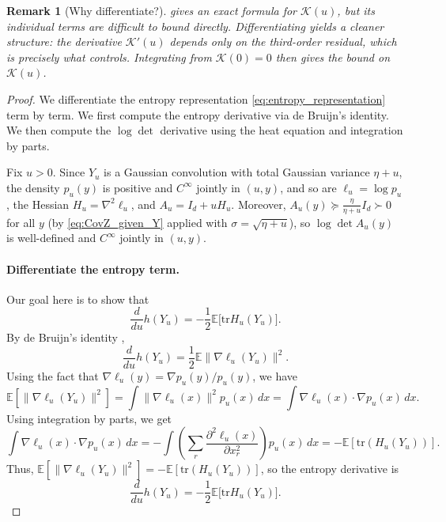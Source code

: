 \documentclass[11pt]{article}
\def\E{\mathbb{E}}
\newcommand{\norm}[1]{\|#1\|}
\newcommand{\tr}{\mathrm{tr}}
\newtheorem{remark}{Remark}
\begin{document}
\begin{remark}[Why differentiate?]
\label{rem:why_differentiate}
 gives an exact formula for \(\mathcal K(u)\), but its individual terms are difficult to bound directly. Differentiating yields a cleaner structure: the derivative \(\mathcal K'(u)\) depends only on the third-order residual, which is precisely what  controls. Integrating from \(\mathcal K(0)=0\) then gives the bound on \(\mathcal K(u)\).
\end{remark}

\begin{proof}
We differentiate the entropy representation \eqref{eq:entropy_representation} term by term. We first compute the entropy derivative via de Bruijn's identity. We then compute the \(\log\det\) derivative using the heat equation and integration by parts. 

Fix \(u>0\). Since \(Y_u\) is a Gaussian convolution with total Gaussian variance \(\eta+u\), the density \(p_u(y)\) is positive and \(C^\infty\) jointly in \((u,y)\), and so are \(\ell_u=\log p_u\), the Hessian \(H_u=\nabla^2\ell_u\), and \(A_u=I_d+uH_u\). Moreover, \(A_u(y)\succeq \frac{\eta}{\eta+u}I_d\succ 0\) for all \(y\) (by \eqref{eq:CovZ_given_Y} applied with \(\sigma=\sqrt{\eta+u}\)), so \(\log\det A_u(y)\) is well-defined and \(C^\infty\) jointly in \((u,y)\).

\paragraph{Differentiate the entropy term.} Our goal here is to show that
\[
\frac{d}{du}h(Y_u) = -\frac12\E\big[\tr H_u(Y_u)\big].
\]
By de Bruijn's identity \cite{stam1959some},
\[
\frac{d}{du}h(Y_u)=\frac12\E\norm{\nabla\ell_u(Y_u)}^2.
\]
Using the fact that \(\nabla\ell_u(y) = \nabla p_u(y) / p_u(y)\), we have
\[
\E[\norm{\nabla\ell_u(Y_u)}^2]
= \int \norm{\nabla\ell_u(x)}^2 p_u(x)\,dx
= \int \nabla\ell_u(x) \cdot \nabla p_u(x)\,dx.
\]
Using integration by parts, we get
\[
\int \nabla\ell_u(x) \cdot \nabla p_u(x)\,dx
= -\int \left(\sum_r \frac{\partial^2 \ell_u(x)}{\partial x_r^2}\right) p_u(x)\,dx
= -\E[\tr(H_u(Y_u))].
\]
Thus, \( \E[\norm{\nabla\ell_u(Y_u)}^2] = -\E[\tr(H_u(Y_u))]\),
so the entropy derivative is
\begin{equation}
\label{eq:entropy_derivative_again}
\frac{d}{du}h(Y_u) = -\frac12\E\big[\tr H_u(Y_u)\big].
\end{equation}


\end{proof}
\end{document}
